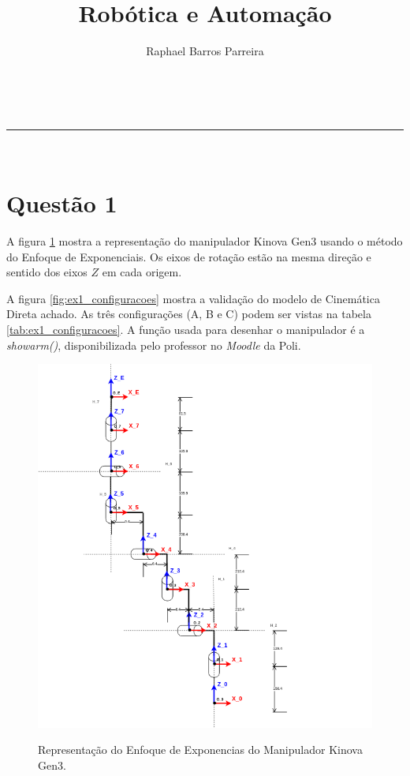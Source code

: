 \documentclass[a4paper,11pt]{article}
\makeatletter
\newcommand{\linia}{\rule{\linewidth}{0.5pt}}
\theoremstyle{mytheor}
\renewcommand{\maketitle}{
\begin{center}
\vspace{2ex}
{\huge \textsc{\@title}}
\vspace{1ex}
\\
\linia\\
\@author \hfill \@date
\vspace{4ex}
\end{center}
}
\makeatother
\begin{document}
\title{Robótica e Automação}

\author{Raphael Barros Parreira}

\date{}

\maketitle

\section*{Questão 1}


A figura \ref{fig:kgen3_representacao_poe} mostra a representação do manipulador Kinova Gen3 usando o método do Enfoque de Exponenciais. Os eixos de rotação estão na mesma direção e sentido dos eixos $ Z $ em cada origem.

A figura \ref{fig:ex1_configuracoes} mostra a validação do modelo de Cinemática Direta achado. As três configurações (A, B e C) podem ser vistas na tabela \ref{tab:ex1_configuracoes}. A função usada para desenhar o manipulador é a \textit{showarm()}, disponibilizada pelo professor no \textit{Moodle} da Poli.


\begin{figure}[!ht]
\centering
\caption{Representação do Enfoque de Exponencias do Manipulador Kinova Gen3.}
\includegraphics[scale=1]{figs/ex1_poe}
\label{fig:kgen3_representacao_poe}
\end{figure}
\end{document}
